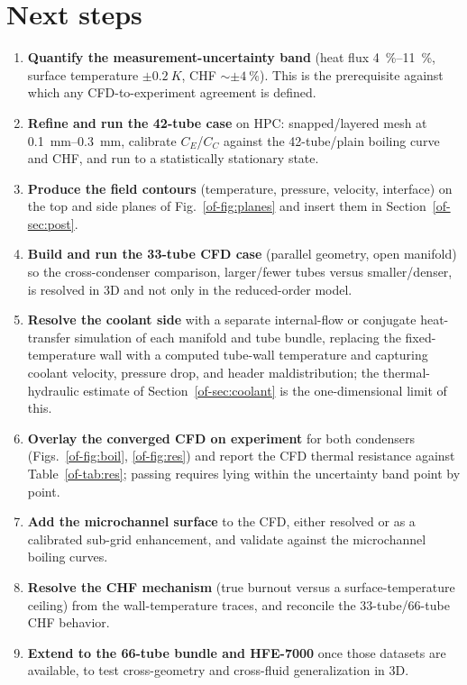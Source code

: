 \documentclass[11pt]{article}
\begin{document}
\section{Next steps}
\label{of-sec:next}
\begin{enumerate}
\item \textbf{Quantify the measurement-uncertainty band} (heat flux \SIrange{4}{11}{\%},
surface temperature $\pm\SI{0.2}{K}$, CHF $\sim\pm\SI{4}{\%}$). This is the prerequisite
against which any CFD-to-experiment agreement is defined.
\item \textbf{Refine and run the 42-tube case} on HPC: snapped/layered mesh at
\SIrange{0.1}{0.3}{mm}, calibrate $C_E$/$C_C$ against the 42-tube/plain boiling curve and
CHF, and run to a statistically stationary state.
\item \textbf{Produce the field contours} (temperature, pressure, velocity, interface) on
the top and side planes of Fig.~\ref{of-fig:planes} and insert them in Section~\ref{of-sec:post}.
\item \textbf{Build and run the 33-tube CFD case} (parallel geometry, open manifold) so the
cross-condenser comparison, larger/fewer tubes versus smaller/denser, is resolved in 3D and
not only in the reduced-order model.
\item \textbf{Resolve the coolant side} with a separate internal-flow or conjugate
heat-transfer simulation of each manifold and tube bundle, replacing the fixed-temperature
wall with a computed tube-wall temperature and capturing coolant velocity, pressure drop, and
header maldistribution; the thermal-hydraulic estimate of Section~\ref{of-sec:coolant} is the
one-dimensional limit of this.
\item \textbf{Overlay the converged CFD on experiment} for both condensers
(Figs.~\ref{of-fig:boil}, \ref{of-fig:res}) and report the CFD thermal resistance against
Table~\ref{of-tab:res}; passing requires lying within the uncertainty band point by point.
\item \textbf{Add the microchannel surface} to the CFD, either resolved or as a calibrated
sub-grid enhancement, and validate against the microchannel boiling curves.
\item \textbf{Resolve the CHF mechanism} (true burnout versus a surface-temperature
ceiling) from the wall-temperature traces, and reconcile the 33-tube/66-tube CHF behavior.
\item \textbf{Extend to the 66-tube bundle and HFE-7000} once those datasets are available,
to test cross-geometry and cross-fluid generalization in 3D.
\end{enumerate}
\end{document}
